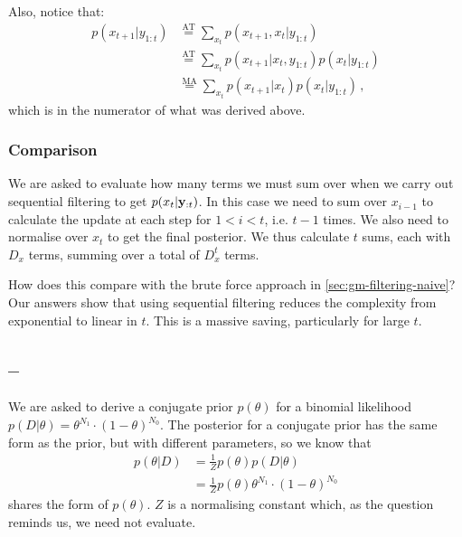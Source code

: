 \documentclass[a4paper]{article}
\newcommand{\questionref}[1]{\Cref{#1} -- \nameref{#1}}
\theoremstyle{definition}
\begin{document}
Also, notice that:
\begin{align}
p(x_{t+1}|y_{1:t}) &\stackrel{\text{AT}}{=} \sum_{x_t} p(x_{t+1},x_t|y_{1:t}) \\
&\stackrel{\text{AT}}{=} \sum_{x_t} p(x_{t+1}|x_t,y_{1:t}) p(x_t|y_{1:t}) \\
&\stackrel{\text{MA}}{=} \sum_{x_t} p(x_{t+1}|x_t) p(x_t|y_{1:t}) \,,
\end{align}
which is in the numerator of what was derived above.

\subsubsection{Comparison}
We are asked to evaluate how many terms we must sum over when we carry out sequential filtering to get $p( x_t | \mathbf{y}_{:t} )$. In this case we need to sum over $x_{i-1}$ to calculate the update at each step for $1<i<t$, i.e. $t-1$ times. We also need to normalise over $x_t$ to get the final posterior. We thus calculate $t$ sums, each with $D_x$ terms, summing over a total of $D_x^t$ terms.

How does this compare with the brute force approach in \ref{sec:gm-filtering-naive}? Our answers show that using sequential filtering reduces the complexity from exponential to linear in $t$. This is a massive saving, particularly for large $t$. 



\subsection{\questionref{q:cp-binomial}}
\label{ans:cp-binomial}
We are asked to derive a conjugate prior $p( \theta )$ for a binomial likelihood $p( D | \theta ) = \theta^{ N_1 } \cdot( 1 - \theta )^{ N_0 }$. The posterior for a conjugate prior has the same form as the prior, but with different parameters, so we know that
\begin{align}
p( \theta | D ) &= \frac{ 1 }{ Z } p( \theta ) p( D | \theta )\\
&= \frac{1}{Z} p( \theta ) \theta^{ N_1 } \cdot( 1 - \theta )^{ N_0 }
\end{align}
shares the form of $p( \theta )$. $Z$ is a normalising constant which, as the question reminds us, we need not evaluate.
\end{document}
